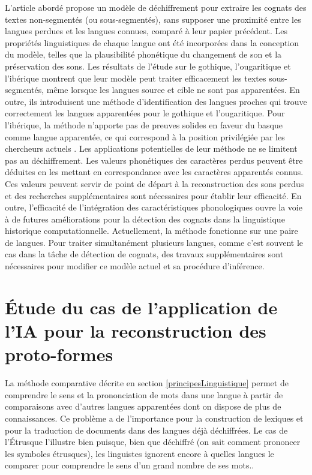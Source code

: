 \documentclass[12pt, french, twoside]{report}
\begin{document}
L'article abordé propose un modèle de déchiffrement pour extraire les cognats des textes non-segmentés (ou sous-segmentés), sans supposer une proximité entre les langues perdues et les langues connues, comparé à leur papier précédent\cite{ugaritic-and-linear-B}. Les propriétés linguistiques de chaque langue ont été incorporées dans la conception du modèle, telles que la plausibilité phonétique du changement de son et la préservation des sons. Les résultats de l'étude sur le gothique, l'ougaritique et l'ibérique montrent que leur modèle peut traiter efficacement les textes sous-segmentés, même lorsque les langues source et cible ne sont pas apparentées. En outre, ils introduisent une méthode d'identification des langues proches qui trouve correctement les langues apparentées pour le gothique et l'ougaritique. Pour l'ibérique, la méthode n'apporte pas de preuves solides en faveur du basque comme langue apparentée, ce qui correspond à la position privilégiée par les chercheurs actuels \cite{deepmind2022}. Les applications potentielles de leur méthode ne se limitent pas au déchiffrement. Les valeurs phonétiques des caractères perdus peuvent être déduites en les mettant en correspondance avec les caractères apparentés connus. Ces valeurs peuvent servir de point de départ à la reconstruction des sons perdus et des recherches supplémentaires sont nécessaires pour établir leur efficacité. En outre, l'efficacité de l'intégration des caractéristiques phonologiques ouvre la voie à de futures améliorations pour la détection des cognats dans la linguistique historique computationnelle. Actuellement, la méthode fonctionne sur une paire de langues. Pour traiter simultanément plusieurs langues, comme c'est souvent le cas dans la tâche de détection de cognats, des travaux supplémentaires sont nécessaires pour modifier ce modèle actuel et sa procédure d'inférence. \\

\chapter{Étude du cas de l'application de l'IA pour la reconstruction des proto-formes}
La méthode comparative décrite en section \ref{principesLinguistique} permet de comprendre le sens et la prononciation de mots dans une langue à partir de comparaisons avec d'autres langues apparentées dont on dispose de plus de connaissances. Ce problème a de l'importance pour la construction de lexiques et pour la traduction de documents dans des langues déjà déchiffrées. Le cas de l'Étrusque l'illustre bien puisque, bien que déchiffré (on sait comment prononcer les symboles étrusques), les linguistes ignorent encore à quelles langues le comparer pour comprendre le sens d'un grand nombre de ses mots.\cite{bnf_etrusque}.
\end{document}
